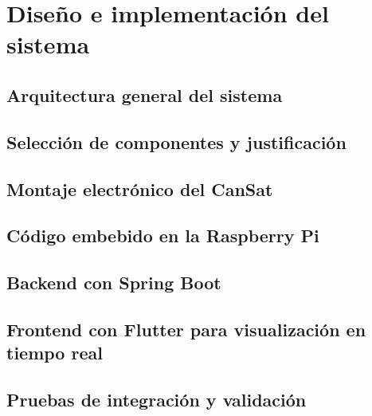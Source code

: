 \chapter{Diseño e implementación del sistema}


\section{Arquitectura general del sistema}


\section{Selección de componentes y justificación}


\section{Montaje electrónico del CanSat}


\section{Código embebido en la Raspberry Pi}


\section{Backend con Spring Boot}


\section{Frontend con Flutter para visualización en tiempo real}


\section{Pruebas de integración y validación}

